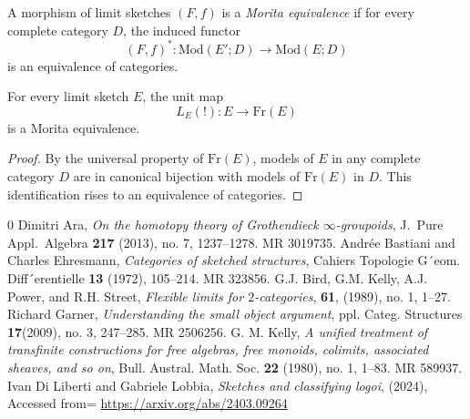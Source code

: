 \documentclass{tac}
\newcommand{\free}{\mathrm{Fr}}
\begin{document}
\begin{definition}
A morphism of limit sketches $(F,f)$ is a \emph{Morita equivalence} if for every complete category $D$, the induced functor
\[
(F,f)^* : \mathrm{Mod}(E';D) \to \mathrm{Mod}(E;D)
\]
is an equivalence of categories.
\end{definition}

\begin{lemma}
For every limit sketch $E$, the unit map
\[
L_E(!) : E \to \free(E)
\]
is a Morita equivalence.
\end{lemma}

\begin{proof}
By the universal property of $\free(E)$, models of $E$ in any complete category $D$ are in canonical bijection with models of $\free(E)$ in $D$. This identification rises to an equivalence of categories.
\end{proof}

\begin{thebibliography}{0}
Dimitri Ara, \emph{On the homotopy theory of Grothendieck $\infty$-groupoids}, J.\ Pure Appl.\ Algebra {\bf217} (2013), no. 7, 1237–1278. MR 3019735.
Andrée Bastiani and Charles Ehresmann,
\emph{Categories of sketched structures}, Cahiers
Topologie G´eom. Diff´erentielle {\bf 13} (1972), 105–214. MR 323856.
G.J. Bird, G.M. Kelly, A.J. Power, and R.H. Street, \emph{Flexible limits for $2$-categories}, {\bf61}, (1989), no. 1, 1–27.
Richard Garner, \emph{Understanding the small object argument}, ppl. Categ. Structures {\bf 17}(2009), no. 3, 247–285. MR 2506256.
G. M. Kelly, \emph{A unified treatment of transfinite constructions for free algebras, free
monoids, colimits, associated sheaves, and so on}, Bull. Austral. Math. Soc. {\bf22} (1980),
no. 1, 1–83. MR 589937.
Ivan Di Liberti and Gabriele Lobbia, \emph{Sketches and classifying logoi}, (2024), Accessed from= \url{https://arxiv.org/abs/2403.09264}
\end{thebibliography}
\end{document}

